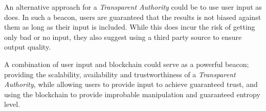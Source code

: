 An alternative approach for a \emph{Transparent Authority} could be to use user input as  does.
In such a beacon, users are guaranteed that the results is not biased against them as long as their input is included.
While this does incur the risk of getting only bad or no input, they also suggest using a third party source to ensure output quality.

A combination of user input and blockchain could serve as a powerful beacon; providing the scalability, availability and trustworthiness of a \emph{Transparent Authority}, while allowing users to provide input to achieve guaranteed trust, and using the blockchain to provide improbable manipulation and guaranteed entropy level.
